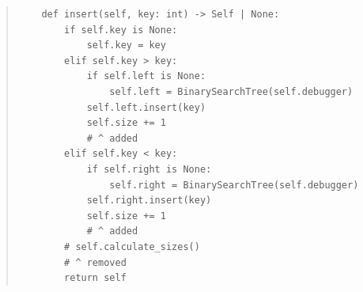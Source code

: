 \documentclass[11pt]{article}
\begin{document}
\begin{enumerate}
\begin{enumerate}
\begin{quote}
           \newline
           \begin{verbatim}
    def insert(self, key: int) -> Self | None:
        if self.key is None:
            self.key = key
        elif self.key > key:
            if self.left is None:
                self.left = BinarySearchTree(self.debugger)
            self.left.insert(key)
            self.size += 1
            # ^ added
        elif self.key < key:
            if self.right is None:
                self.right = BinarySearchTree(self.debugger)
            self.right.insert(key)
            self.size += 1
            # ^ added
        # self.calculate_sizes()
        # ^ removed
        return self
           \end{verbatim}
           \vspace{1em}
        \end{quote}
        \newpage
        

\end{enumerate}
\end{enumerate}
\end{document}
